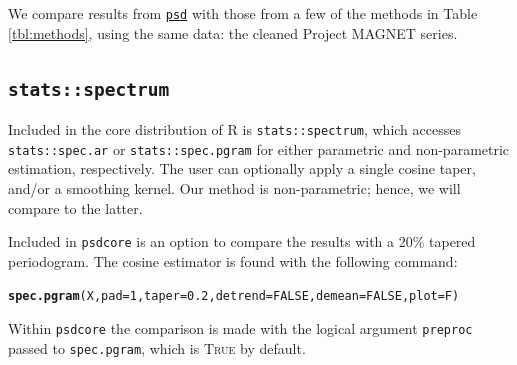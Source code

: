 \documentclass[10pt]{article}\usepackage[]{graphicx}\usepackage[]{color}
\makeatletter
\newcommand{\hlnum}[1]{\textcolor[rgb]{0.686,0.059,0.569}{#1}}%
\newcommand{\hlstd}[1]{\textcolor[rgb]{0.345,0.345,0.345}{#1}}%
\newcommand{\hlkwc}[1]{\textcolor[rgb]{0.333,0.667,0.333}{#1}}%
\newcommand{\hlkwd}[1]{\textcolor[rgb]{0.737,0.353,0.396}{\textbf{#1}}}%
\newenvironment{kframe}{%
 \def\at@end@of@kframe{}%
 \ifinner\ifhmode%
  \def\at@end@of@kframe{\end{minipage}}%
  \begin{minipage}{\columnwidth}%
 \fi\fi%
 \def\FrameCommand##1{\hskip\@totalleftmargin \hskip-\fboxsep
 \colorbox{shadecolor}{##1}\hskip-\fboxsep
     \hskip-\linewidth \hskip-\@totalleftmargin \hskip\columnwidth}%
 \MakeFramed {\advance\hsize-\width
   \@totalleftmargin\z@ \linewidth\hsize
   \@setminipage}}%
 {\par\unskip\endMakeFramed%
 \at@end@of@kframe}
\newenvironment{knitrout}{}{} %
\newcommand{\SC}[1]{\textsc{#1}}
\newcommand{\Rcmd}[1]{\texttt{#1}}
\newcommand{\psd}[0]{\href{http://abarbour.github.com/psd/}{\color{blue}\Rcmd{psd}}}
\makeatother
\begin{document}


We compare results from
\psd{} with those from a few of the methods in Table \ref{tbl:methods},
using the same data: the cleaned Project MAGNET series.

\subsection{\Rcmd{stats::spectrum}}

Included in the core distribution of R is \Rcmd{stats::spectrum}, which
accesses \Rcmd{stats::spec.ar} or \Rcmd{stats::spec.pgram} for either
parametric and non-parametric estimation, respectively.  
The user can optionally apply a single cosine taper, and/or a smoothing kernel.
Our method is non-parametric; hence, we will compare to the latter.

Included in \Rcmd{psdcore} is an option to compare the 
results with a 20\% tapered periodogram.
The cosine estimator is found with the following command:
\begin{knitrout}
\color{fgcolor}\begin{kframe}
\begin{alltt}
\hlkwd{spec.pgram}\hlstd{(X,} \hlkwc{pad}\hlstd{=}\hlnum{1}\hlstd{,} \hlkwc{taper}\hlstd{=}\hlnum{0.2}\hlstd{,} \hlkwc{detrend}\hlstd{=}\hlnum{FALSE}\hlstd{,} \hlkwc{demean}\hlstd{=}\hlnum{FALSE}\hlstd{,} \hlkwc{plot}\hlstd{=F)}
\end{alltt}
\end{kframe}
\end{knitrout}
Within \Rcmd{psdcore} the comparison is
made with
the logical argument \Rcmd{preproc} 
passed to \Rcmd{spec.pgram}, which is \SC{True} by default.
\end{document}
